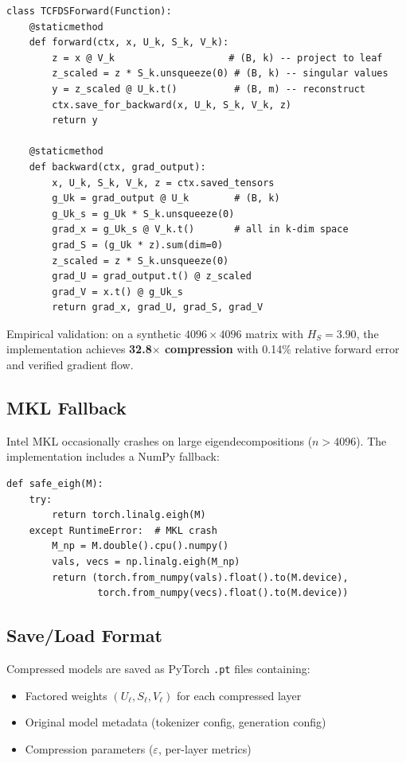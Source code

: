 \documentclass[11pt,a4paper]{article}
\begin{document}
\begin{lstlisting}
class TCFDSForward(Function):
    @staticmethod
    def forward(ctx, x, U_k, S_k, V_k):
        z = x @ V_k                    # (B, k) -- project to leaf
        z_scaled = z * S_k.unsqueeze(0) # (B, k) -- singular values
        y = z_scaled @ U_k.t()          # (B, m) -- reconstruct
        ctx.save_for_backward(x, U_k, S_k, V_k, z)
        return y

    @staticmethod
    def backward(ctx, grad_output):
        x, U_k, S_k, V_k, z = ctx.saved_tensors
        g_Uk = grad_output @ U_k        # (B, k)
        g_Uk_s = g_Uk * S_k.unsqueeze(0)
        grad_x = g_Uk_s @ V_k.t()       # all in k-dim space
        grad_S = (g_Uk * z).sum(dim=0)
        z_scaled = z * S_k.unsqueeze(0)
        grad_U = grad_output.t() @ z_scaled
        grad_V = x.t() @ g_Uk_s
        return grad_x, grad_U, grad_S, grad_V
\end{lstlisting}

Empirical validation: on a synthetic $4096 \times 4096$ matrix with $H_S = 3.90$, the implementation achieves \textbf{32.8$\times$ compression} with 0.14\% relative forward error and verified gradient flow.

\subsection{MKL Fallback}

Intel MKL occasionally crashes on large eigendecompositions ($n > 4096$). The implementation includes a NumPy fallback:

\begin{lstlisting}
def safe_eigh(M):
    try:
        return torch.linalg.eigh(M)
    except RuntimeError:  # MKL crash
        M_np = M.double().cpu().numpy()
        vals, vecs = np.linalg.eigh(M_np)
        return (torch.from_numpy(vals).float().to(M.device),
                torch.from_numpy(vecs).float().to(M.device))
\end{lstlisting}

\subsection{Save/Load Format}

Compressed models are saved as PyTorch \texttt{.pt} files containing:
\begin{itemize}
    \item Factored weights $(U_\ell, S_\ell, V_\ell)$ for each compressed layer
    \item Original model metadata (tokenizer config, generation config)
    \item Compression parameters ($\varepsilon$, per-layer metrics)
\end{itemize}
\end{document}
